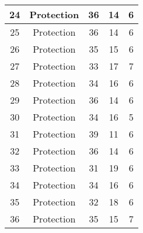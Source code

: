 \documentclass[results.tex]{subfiles}
\begin{document}
\begin{center}
\begin{tabular}{| c || c | c | c | c |}
            \hline
            24                      & Protection                   & 36                     & 14                      & 6                    \\
            \hline
            25                      & Protection                   & 36                     & 14                      & 6                    \\
            \hline
            26                      & Protection                   & 35                     & 15                      & 6                    \\
            \hline
            27                      & Protection                   & 33                     & 17                      & 7                    \\
            \hline
            28                      & Protection                   & 34                     & 16                      & 6                    \\
            \hline
            29                      & Protection                   & 36                     & 14                      & 6                    \\
            \hline
            30                      & Protection                   & 34                     & 16                      & 5                    \\
            \hline
            31                      & Protection                   & 39                     & 11                      & 6                    \\
            \hline
            32                      & Protection                   & 36                     & 14                      & 6                    \\
            \hline
            33                      & Protection                   & 31                     & 19                      & 6                    \\
            \hline
            34                      & Protection                   & 34                     & 16                      & 6                    \\
            \hline
            35                      & Protection                   & 32                     & 18                      & 6                    \\
            \hline
            36                      & Protection                   & 35                     & 15                      & 7                    \\

\end{tabular}
\end{center}
\end{document}

